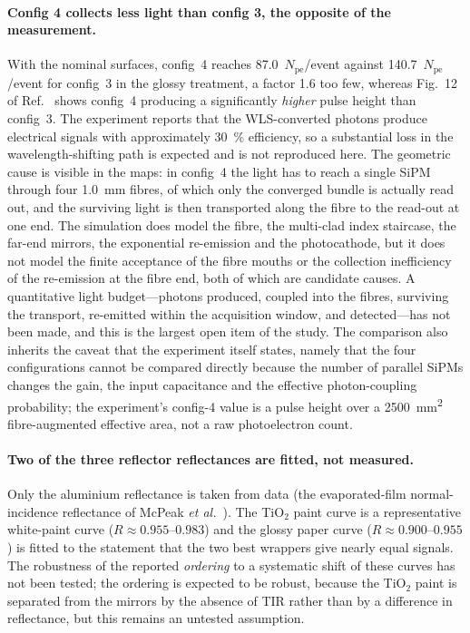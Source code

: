 \documentclass[11pt,a4paper]{article}
\newcommand{\pe}{\ensuremath{N_{\mathrm{pe}}}}
\begin{document}
\paragraph{Config 4 collects less light than config 3, the opposite of the
measurement.}
With the nominal surfaces, config~4 reaches \num{87.0}~\pe/event against
\num{140.7}~\pe/event for config~3 in the glossy treatment, a factor \num{1.6}
too few, whereas Fig.~12 of Ref.~\cite{Rao2025} shows config~4 producing a
significantly \emph{higher} pulse height than config~3. The experiment reports
that the WLS-converted photons produce electrical signals with approximately
\SI{30}{\percent} efficiency, so a substantial loss in the wavelength-shifting
path is expected and is not reproduced here. The geometric cause is visible in
the maps: in config~4 the light has to reach a single SiPM through four
\SI{1.0}{\milli\meter} fibres, of which only the converged bundle is actually
read out, and the surviving light is then transported along the fibre to the
read-out at one end. The simulation does model the fibre, the multi-clad
index staircase, the far-end mirrors, the exponential re-emission and the
photocathode, but it does not model the finite acceptance of the fibre mouths
or the collection inefficiency of the re-emission at the fibre end, both of
which are candidate causes. A quantitative light budget---photons produced,
coupled into the fibres, surviving the transport, re-emitted within the
acquisition window, and detected---has not been made, and this is the largest
open item of the study. The comparison also inherits the caveat that the
experiment itself states, namely that the four configurations cannot be
compared directly because the number of parallel SiPMs changes the gain, the
input capacitance and the effective photon-coupling probability; the
experiment's config-4 value is a pulse height over a \SI{2500}{\milli\meter\squared}
fibre-augmented effective area, not a raw photoelectron count.

\paragraph{Two of the three reflector reflectances are fitted, not measured.}
Only the aluminium reflectance is taken from data (the evaporated-film
normal-incidence reflectance of McPeak \emph{et al.}~\cite{McPeak2015}). The
TiO$_2$ paint curve is a representative white-paint curve
($R \approx 0.955$--$0.983$) and the glossy paper curve
($R \approx 0.900$--$0.955$) is fitted to the statement that the two best
wrappers give nearly equal signals. The robustness of the reported
\emph{ordering} to a systematic shift of these curves has not been tested; the
ordering is expected to be robust, because the TiO$_2$ paint is separated from
the mirrors by the absence of TIR rather than by a difference in reflectance,
but this remains an untested assumption.
\end{document}
